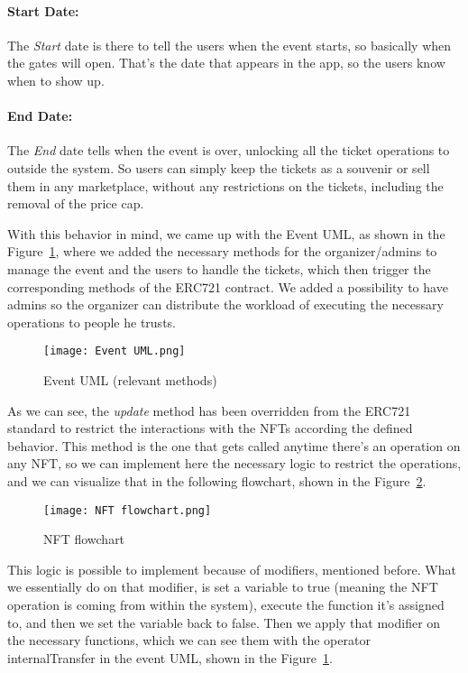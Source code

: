 \paragraph{Start Date:} The \textit{Start} date is there to tell the users when the event starts, so
basically when the gates will open. That's the date that appears in the app, so
the users know when to show up.

\paragraph{End Date:} The \textit{End} date tells when the event is over, unlocking all the ticket
operations to outside the system. So users can simply keep the tickets as a
souvenir or sell them in any marketplace, without any restrictions on the
tickets, including the removal of the price cap.

With this behavior in mind, we came up with the Event UML, as shown in the
Figure~\ref{fig:event_uml}, where we added the necessary methods for the
organizer/admins to manage the event and the users to handle the tickets, which
then trigger the corresponding methods of the ERC721 contract. We added a
possibility to have admins so the organizer can distribute the workload of
executing the necessary operations to people he trusts.

\begin{figure}[H]
	\texttt{[image: Event UML.png]}
	\centering
	\caption{Event UML (relevant methods)}\label{fig:event_uml}
\end{figure}

As we can see, the \textit{update} method has been overridden from the ERC721
standard to restrict the interactions with the NFTs according the defined
behavior. This method is the one that gets called anytime there's an operation
on any NFT, so we can implement here the necessary logic to restrict the
operations, and we can visualize that in the following flowchart, shown in the
Figure~\ref{fig:nft_flowchart}.

\begin{figure}[H]
	\texttt{[image: NFT flowchart.png]}
	\centering
	\caption{NFT flowchart}\label{fig:nft_flowchart}
\end{figure}

This logic is possible to implement because of modifiers, mentioned before.
What we essentially do on that modifier, is set a variable to true (meaning the
NFT operation is coming from within the system), execute the function it's
assigned to, and then we set the variable back to false. Then we apply that
modifier on the necessary functions, which we can see them with the operator
	{internalTransfer} in the event UML, shown in the Figure~\ref{fig:event_uml}.

